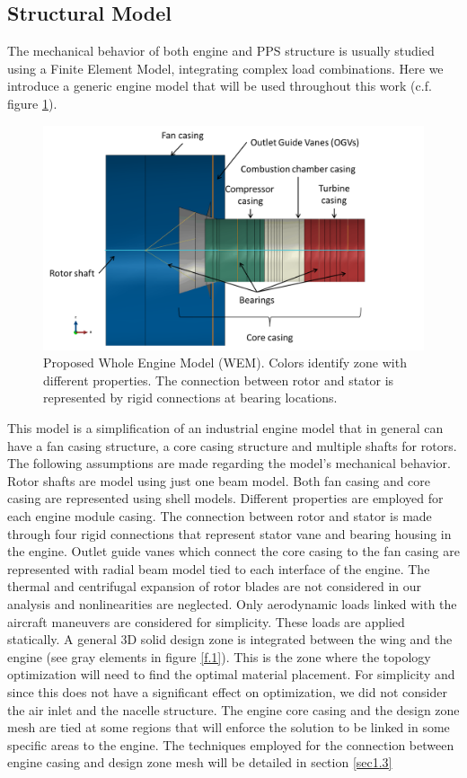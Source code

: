 \subsection{Structural Model}
\label{ssec1.2.1}
The mechanical behavior of both engine and PPS structure is usually studied using a Finite Element Model, integrating complex load combinations. Here we introduce a generic engine model that will be used throughout this work (c.f. figure \ref{enginewem}). 
\begin{figure}[hbt!]
\centering
\includegraphics[width=1\textwidth]{images/Ch1/enginegeometry}
\caption{Proposed Whole Engine Model (WEM). Colors identify zone with different properties. The connection between rotor and stator is represented by rigid connections at bearing locations.\label{enginewem}}
\end{figure}
This model is a simplification of an industrial engine model that in general can have a fan casing structure, a core casing structure and multiple shafts for rotors. The following assumptions are made regarding the model's mechanical behavior. Rotor shafts are model using just one beam model. Both fan casing and core casing are represented using shell models. Different properties are employed for each engine module casing. The connection between rotor and stator is made through four rigid connections that represent stator vane and bearing housing in the engine. Outlet guide vanes which connect the core casing to the fan casing are represented with radial beam model tied to each interface of the engine. The thermal and centrifugal expansion of rotor blades are not considered in our analysis and nonlinearities are neglected. Only aerodynamic loads linked with the aircraft maneuvers are considered for simplicity. These loads are applied statically. A general 3D solid design zone is integrated between the wing and the engine (see gray elements in figure \ref{f.1}). This is the zone where the topology optimization will need to find the optimal material placement. For simplicity and since this does not have a significant effect on optimization, we did not consider the air inlet and the nacelle structure.  The engine core casing and the design zone mesh are tied at some regions that will enforce the solution to be linked in some specific areas to the engine. The techniques employed for the connection between engine casing and design zone mesh will be detailed in section \ref{sec1.3}
